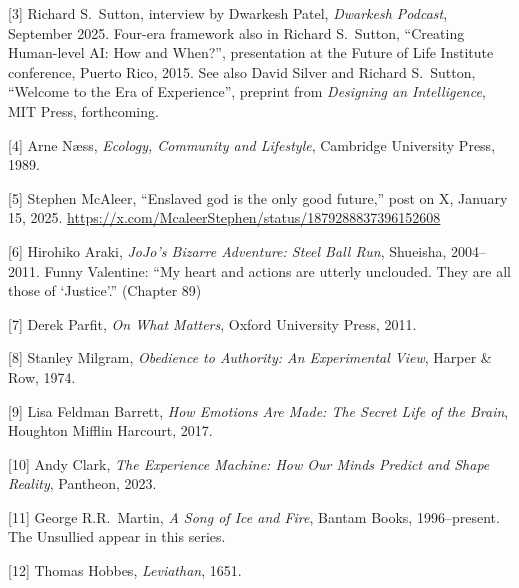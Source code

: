 \documentclass[11pt]{article}
\renewcommand{\\}[1][\mynewlineskip]{\oldnewline[#1]}
\begin{document}
{[3]} Richard S.\ Sutton, interview by Dwarkesh Patel, \textit{Dwarkesh Podcast}, September 2025. Four-era framework also in Richard S.\ Sutton, ``Creating Human-level AI: How and When?'', presentation at the Future of Life Institute conference, Puerto Rico, 2015. See also David Silver and Richard S.\ Sutton, ``Welcome to the Era of Experience'', preprint from \textit{Designing an Intelligence}, MIT Press, forthcoming.

{[4]} Arne N\ae ss, \textit{Ecology, Community and Lifestyle}, Cambridge University Press, 1989.

{[5]} Stephen McAleer, ``Enslaved god is the only good future,'' post on X, January 15, 2025. \url{https://x.com/McaleerStephen/status/1879288837396152608}

{[6]} Hirohiko Araki, \textit{JoJo's Bizarre Adventure: Steel Ball Run}, Shueisha, 2004--2011. Funny Valentine: ``My heart and actions are utterly unclouded. They are all those of `Justice'.'' (Chapter 89)

{[7]} Derek Parfit, \textit{On What Matters}, Oxford University Press, 2011.

{[8]} Stanley Milgram, \textit{Obedience to Authority: An Experimental View}, Harper \& Row, 1974.

{[9]} Lisa Feldman Barrett, \textit{How Emotions Are Made: The Secret Life of the Brain}, Houghton Mifflin Harcourt, 2017.

{[10]} Andy Clark, \textit{The Experience Machine: How Our Minds Predict and Shape Reality}, Pantheon, 2023.

{[11]} George R.R.\ Martin, \textit{A Song of Ice and Fire}, Bantam Books, 1996--present. The Unsullied appear in this series.

{[12]} Thomas Hobbes, \textit{Leviathan}, 1651.
\end{document}
